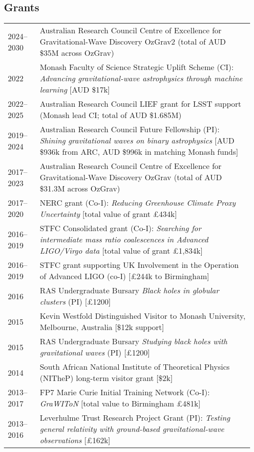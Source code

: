 \documentclass[margin,line]{res}
\begin{document}
\begin{resume}
\section{\sc Grants}
\begin{tabular}{@{}p{0.8in}p{4.7in}}
2024--2030 & Australian Research Council Centre of Excellence for Gravitational-Wave Discovery OzGrav2 (total of AUD \$35M across OzGrav)\\
2022 & Monash Faculty of Science Strategic Uplift Scheme (CI): {\it Advancing gravitational-wave astrophysics through machine learning} [AUD \$17k]\\
2022--2025 &  Australian Research Council LIEF grant for LSST support (Monash lead CI; total of AUD \$1.685M)\\
2019--2024 & Australian Research Council Future Fellowship (PI): {\it  Shining gravitational waves on binary astrophysics} [AUD \$936k from ARC, AUD \$996k in matching Monash funds]\\
2017--2023 & Australian Research Council Centre of Excellence for Gravitational-Wave Discovery OzGrav (total of AUD \$31.3M across OzGrav)\\
2017--2020 & NERC grant (Co-I): {\it Reducing Greenhouse Climate Proxy Uncertainty} [total value of grant \pounds 434k]\\
2016--2019 & STFC Consolidated grant (Co-I): {\it Searching for intermediate mass ratio coalescences in Advanced LIGO/Virgo data} [total value of grant \pounds1,834k]\\
2016--2019 & STFC grant supporting UK Involvement in the Operation of Advanced LIGO (co-I) [\pounds 244k to Birmingham]\\
2016 & RAS Undergraduate Bursary {\it Black holes in globular clusters} (PI) [\pounds 1200]\\
2015 & Kevin Westfold Distinguished Visitor to Monash University, Melbourne, Australia [\$12k support]\\
2015 & RAS Undergraduate Bursary {\it Studying black holes with gravitational waves} (PI) [\pounds 1200]\\
2014 & South African National Institute of Theoretical Physics (NITheP) long-term visitor grant [\$2k]\\
2013--2017 & FP7 Marie Curie Initial Training Network (Co-I): {\it GraWIToN} [total value to Birmingham \pounds 481k]\\
2013--2016 & Leverhulme Trust Research Project Grant (PI): {\it Testing general relativity with ground-based gravitational-wave observations} [\pounds162k]\\

\end{tabular}
\end{resume}
\end{document}
